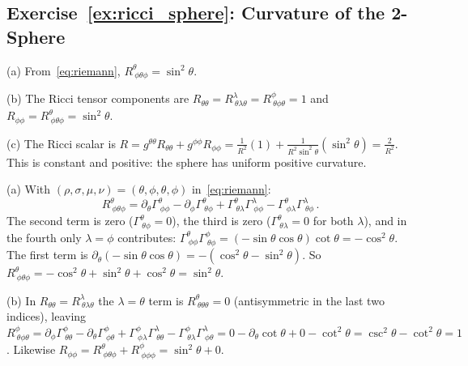 \subsection*{Exercise~\ref{ex:ricci_sphere}: Curvature of the 2-Sphere}

(a) From~\eqref{eq:riemann},
$R^\theta_{\ \phi\theta\phi} = \sin^2\theta$.

(b) The Ricci tensor components are $R_{\theta\theta} = R^\lambda_{\ \theta\lambda\theta}
= R^\phi_{\ \theta\phi\theta} = 1$ and
$R_{\phi\phi} = R^\theta_{\ \phi\theta\phi} = \sin^2\theta$.

(c) The Ricci scalar is
$R = g^{\theta\theta}R_{\theta\theta} + g^{\phi\phi}R_{\phi\phi}
= \frac{1}{R^2}(1) + \frac{1}{R^2\sin^2\theta}(\sin^2\theta)
= \frac{2}{R^2}$.
This is constant and positive: the sphere has uniform positive curvature.

\begin{derivation}
(a) With $(\rho,\sigma,\mu,\nu) = (\theta,\phi,\theta,\phi)$ in~\eqref{eq:riemann}:
\[
    R^\theta_{\ \phi\theta\phi}
    = \partial_\theta\Gamma^\theta_{\ \phi\phi} - \partial_\phi\Gamma^\theta_{\ \theta\phi}
      + \Gamma^\theta_{\ \theta\lambda}\Gamma^\lambda_{\ \phi\phi}
      - \Gamma^\theta_{\ \phi\lambda}\Gamma^\lambda_{\ \theta\phi} \,.
\]
The second term is zero ($\Gamma^\theta_{\ \theta\phi} = 0$), the third is zero
($\Gamma^\theta_{\ \theta\lambda} = 0$ for both $\lambda$), and in the fourth only
$\lambda = \phi$ contributes:
$\Gamma^\theta_{\ \phi\phi}\Gamma^\phi_{\ \theta\phi} = (-\sin\theta\cos\theta)\cot\theta = -\cos^2\theta$.
The first term is $\partial_\theta(-\sin\theta\cos\theta) = -(\cos^2\theta - \sin^2\theta)$. So
$R^\theta_{\ \phi\theta\phi} = -\cos^2\theta + \sin^2\theta + \cos^2\theta = \sin^2\theta$.

(b) In $R_{\theta\theta} = R^\lambda_{\ \theta\lambda\theta}$ the $\lambda = \theta$ term
is $R^\theta_{\ \theta\theta\theta} = 0$ (antisymmetric in the last two indices), leaving
$R^\phi_{\ \theta\phi\theta} = \partial_\phi\Gamma^\phi_{\ \theta\theta} - \partial_\theta\Gamma^\phi_{\ \phi\theta}
+ \Gamma^\phi_{\ \phi\lambda}\Gamma^\lambda_{\ \theta\theta} - \Gamma^\phi_{\ \theta\lambda}\Gamma^\lambda_{\ \phi\theta}
= 0 - \partial_\theta\cot\theta + 0 - \cot^2\theta = \csc^2\theta - \cot^2\theta = 1$.
Likewise $R_{\phi\phi} = R^\theta_{\ \phi\theta\phi} + R^\phi_{\ \phi\phi\phi} = \sin^2\theta + 0$.
\end{derivation}

